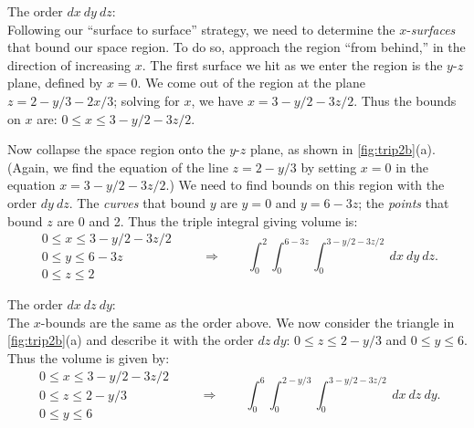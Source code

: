 \begin{example}
\noindent The order $dx\ dy\ dz$:\\

Following our ``surface to surface\dotso'' strategy, we need to determine the $x$-\textit{surfaces} that bound our space region. To do so, approach the region ``from behind,'' in the direction of increasing $x$. The first surface we hit as we enter the region is the $y$-$z$ plane, defined by $x=0$. We come out of the region at the plane $z=2-y/3-2x/3$; solving for $x$, we have $x= 3-y/2-3z/2$. Thus the bounds on $x$ are: $0\leq x\leq 3-y/2-3z/2$.

Now collapse the space region onto the $y$-$z$ plane, as shown in \autoref{fig:trip2b}(a). (Again, we find the equation of the line $z=2-y/3$ by setting $x=0$ in the equation $x=3-y/2-3z/2$.) We need to find bounds on this region with the order $dy\ dz$. The \textit{curves} that bound $y$ are $y=0$ and $y=6-3z$; the \textit{points} that bound $z$ are 0 and 2. Thus the triple integral giving volume is:
\[
 \begin{gathered}
  0\leq x\leq 3-y/2-3z/2\\
  0\leq y\leq 6-3z\\
  0\leq z\leq 2
 \end{gathered}
 \qquad\Rightarrow\qquad
 \int_0^2\int_0^{6-3z}\int_0^{3-y/2-3z/2}\ dx\ dy\ dz.
\]


\noindent The order $dx\ dz\ dy$:\\

The $x$-bounds are the same as the order above. We now consider the triangle in \autoref{fig:trip2b}(a) and describe it with the order $dz\ dy$: $0\leq z\leq 2-y/3$ and $0\leq y\leq 6$. Thus the volume is given by:
\[
 \begin{gathered}
  0\leq x\leq 3-y/2-3z/2\\
  0\leq z\leq 2-y/3\\
  0\leq y\leq 6
 \end{gathered}
 \qquad\Rightarrow\qquad
 \int_0^6\int_0^{2-y/3}\int_0^{3-y/2-3z/2}\ dx\ dz\ dy.
\]


\end{example}
